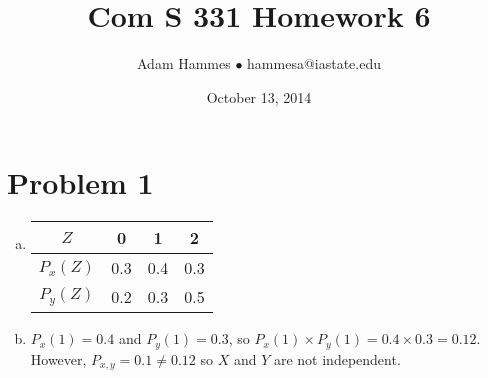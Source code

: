 \documentclass[11pt]{article}
\begin{document}
\title{Com S 331 Homework 6}
\author{Adam Hammes $\bullet$ hammesa@iastate.edu}
\date{October 13, 2014}
\maketitle

\section*{Problem 1}
\begin{enumerate}[(a)]
	\item
		\begin{tabular}{ c | c c c}
			$Z$	& 0 & 1 & 2 \\
			\hline
			$P_x(Z)$ & 0.3 & 0.4 & 0.3 \\
			$P_y(Z)$ & 0.2 & 0.3 & 0.5
		\end{tabular}
		
	\item
		$P_x(1) = 0.4$ and $P_y(1) = 0.3$, so $P_x(1) \times P_y(1) = 0.4 \times 0.3 = 0.12$. However, $P_{x,y} = 0.1 \neq 0.12$ so $X$ and $Y$ are not independent.


\end{enumerate}
\end{document}
